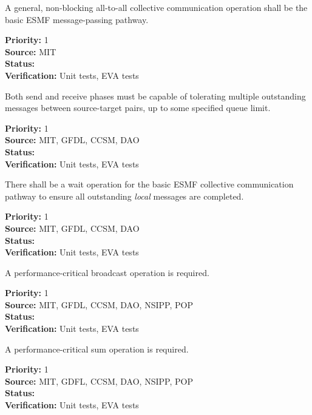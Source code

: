 
A general, non-blocking all-to-all collective communication operation
shall be the basic ESMF message-passing pathway.
\begin{reqlist}
{\bf Priority:} 1 \\
{\bf Source:}  MIT \\
{\bf Status:}  \\
{\bf Verification:} Unit tests, EVA tests 
\end{reqlist}


Both send and receive phases must be capable of tolerating multiple
outstanding messages between source-target pairs, up to some specified
queue limit.
\begin{reqlist}
{\bf Priority:} 1 \\
{\bf Source:}  MIT, GFDL, CCSM, DAO \\
{\bf Status:}  \\
{\bf Verification:} Unit tests, EVA tests 
\end{reqlist}


There shall be a wait operation for the basic ESMF collective
communication pathway to ensure all outstanding \emph{local} messages
are completed.
\begin{reqlist}
{\bf Priority:} 1 \\
{\bf Source:}  MIT, GFDL, CCSM, DAO \\
{\bf Status:}  \\
{\bf Verification:} Unit tests, EVA tests 
\end{reqlist}


A performance-critical broadcast operation is required.
\begin{reqlist}
{\bf Priority:} 1 \\
{\bf Source:}  MIT, GFDL, CCSM, DAO, NSIPP, POP \\
{\bf Status:}  \\
{\bf Verification:} Unit tests, EVA tests 
\end{reqlist}

A performance-critical sum operation is required.
\begin{reqlist}
{\bf Priority:} 1 \\
{\bf Source:}  MIT, GDFL, CCSM, DAO, NSIPP, POP \\
{\bf Status:}  \\
{\bf Verification:} Unit tests, EVA tests 
\end{reqlist}

